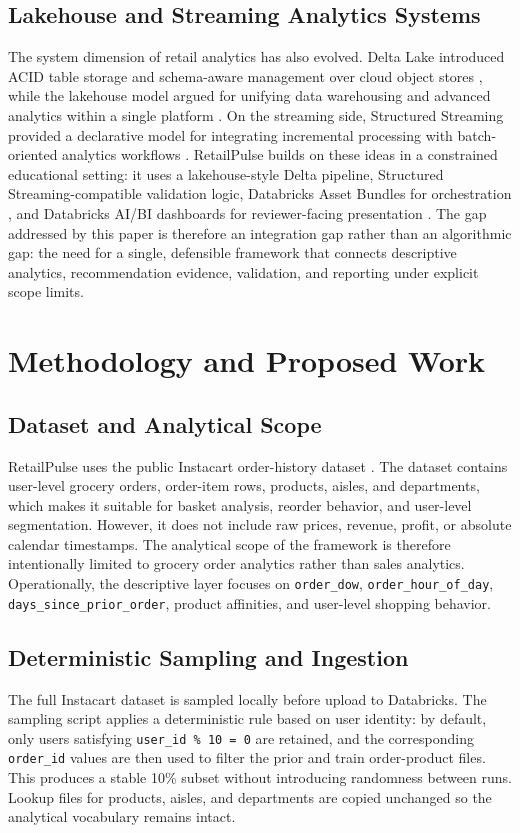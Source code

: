 \documentclass[journal]{IEEEtran}
\begin{document}
\subsection{Lakehouse and Streaming Analytics Systems}
The system dimension of retail analytics has also evolved. Delta Lake introduced ACID table storage and schema-aware management over cloud object stores \cite{armbrust2020deltalake}, while the lakehouse model argued for unifying data warehousing and advanced analytics within a single platform \cite{zaharia2021lakehouse}. On the streaming side, Structured Streaming provided a declarative model for integrating incremental processing with batch-oriented analytics workflows \cite{armbrust2018structured}. RetailPulse builds on these ideas in a constrained educational setting: it uses a lakehouse-style Delta pipeline, Structured Streaming-compatible validation logic, Databricks Asset Bundles for orchestration \cite{databricks_bundles}, and Databricks AI/BI dashboards for reviewer-facing presentation \cite{databricks_dashboards}. The gap addressed by this paper is therefore an integration gap rather than an algorithmic gap: the need for a single, defensible framework that connects descriptive analytics, recommendation evidence, validation, and reporting under explicit scope limits.

\section{Methodology and Proposed Work}
\subsection{Dataset and Analytical Scope}
RetailPulse uses the public Instacart order-history dataset \cite{instacart_dataset}. The dataset contains user-level grocery orders, order-item rows, products, aisles, and departments, which makes it suitable for basket analysis, reorder behavior, and user-level segmentation. However, it does not include raw prices, revenue, profit, or absolute calendar timestamps. The analytical scope of the framework is therefore intentionally limited to grocery order analytics rather than sales analytics. Operationally, the descriptive layer focuses on \texttt{order\_dow}, \texttt{order\_hour\_of\_day}, \texttt{days\_since\_prior\_order}, product affinities, and user-level shopping behavior.

\subsection{Deterministic Sampling and Ingestion}
The full Instacart dataset is sampled locally before upload to Databricks. The sampling script applies a deterministic rule based on user identity: by default, only users satisfying \texttt{user\_id \% 10 = 0} are retained, and the corresponding \texttt{order\_id} values are then used to filter the prior and train order-product files. This produces a stable 10\% subset without introducing randomness between runs. Lookup files for products, aisles, and departments are copied unchanged so the analytical vocabulary remains intact.
\end{document}

